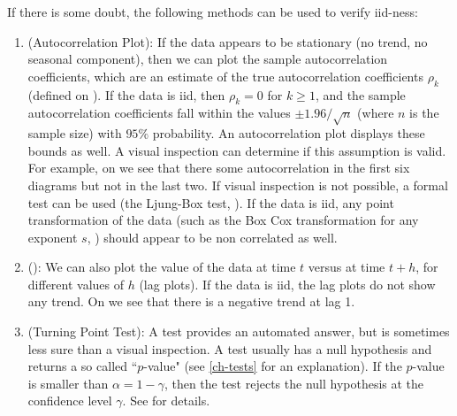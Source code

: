 If there is some doubt, the following methods can be used to
verify iid-ness:\doitemsep
\begin{enumerate}
\item (Autocorrelation Plot): If the data appears to be
    stationary (no trend, no seasonal component), then we
    can plot the sample autocorrelation coefficients, which
    are an estimate of the true autocorrelation
    coefficients $\rho_k$ (defined on ). If
    the data is iid, then $\rho_k=0$ for $k \geq 1$, and
    the sample autocorrelation coefficients fall within the
    values $\pm 1.96 / \sqrt{n}$ (where $n$ is the sample
    size) with $95\%$ probability. An autocorrelation plot
    displays these bounds as well. A visual inspection can
    determine if this assumption is valid. For example, on
     we see that there some
    autocorrelation in the first six diagrams but not in
    the last two. If visual inspection is not possible, a
    formal test can be used (the Ljung-Box test,
    ). If the data is iid, any point
    transformation of the data (such as the Box Cox
    transformation for any exponent $s$,
    ) should appear to be non
    correlated as well.

    \item (): We can also plot the value of
        the data at time $t$ versus at time $t+h$, for
        different values of $h$ (lag plots). If the data is
        iid, the lag plots do not show any trend. On
         we see that there is a
        negative trend at lag 1.

    \item (Turning Point Test):  A test provides an
        automated answer, but is sometimes less sure than a
        visual inspection. A test usually has a null
        hypothesis and returns a so called ``$p$-value"
        (see \cref{ch-tests} for an explanation). If the
        $p$-value is smaller than $\alpha=1-\gamma$, then
        the test rejects the null hypothesis at the
        confidence level $\gamma$. %
See  for details.


\end{enumerate}

